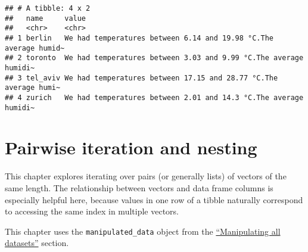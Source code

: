 \documentclass[]{book}
\newenvironment{Shaded}{\begin{snugshade}}{\end{snugshade}}
\newcommand{\KeywordTok}[1]{\textcolor[rgb]{0.13,0.29,0.53}{\textbf{#1}}}
\newcommand{\NormalTok}[1]{#1}
\newcommand{\OperatorTok}[1]{\textcolor[rgb]{0.81,0.36,0.00}{\textbf{#1}}}
\newcommand{\StringTok}[1]{\textcolor[rgb]{0.31,0.60,0.02}{#1}}
\begin{document}
\begin{enumerate}
\begin{Shaded}
\begin{Highlighting}[]
{{{{\NormalTok{input_data }\OperatorTok{%>%}\StringTok{ }
\StringTok{  }\KeywordTok{___}\NormalTok{(___) }\OperatorTok{%>%}
\StringTok{  }\KeywordTok{___}\NormalTok{(___) }\OperatorTok{%>%}\StringTok{ }
\StringTok{  }\KeywordTok{___}\NormalTok{()}
\end{Highlighting}
\end{Shaded}

\begin{verbatim}
## # A tibble: 4 x 2
##   name     value                                                           
##   <chr>    <chr>                                                           
## 1 berlin   We had temperatures between 6.14 and 19.98 °C.The average humid~
## 2 toronto  We had temperatures between 3.03 and 9.99 °C.The average humidi~
## 3 tel_aviv We had temperatures between 17.15 and 28.77 °C.The average humi~
## 4 zurich   We had temperatures between 2.01 and 14.3 °C.The average humidi~
\end{verbatim}
\end{enumerate}

\hypertarget{pairwise-iteration-and-nesting}{%
\chapter{Pairwise iteration and nesting}\label{pairwise-iteration-and-nesting}}

This chapter explores iterating over pairs (or generally lists) of vectors of the same length.
The relationship between vectors and data frame columns is especially helpful here, because values in one row of a tibble naturally correspond to accessing the same index in multiple vectors.

This chapter uses the \texttt{manipulated\_data} object from the \protect\hyperlink{map_manip}{``Manipulating all datasets''} section.
\end{document}
